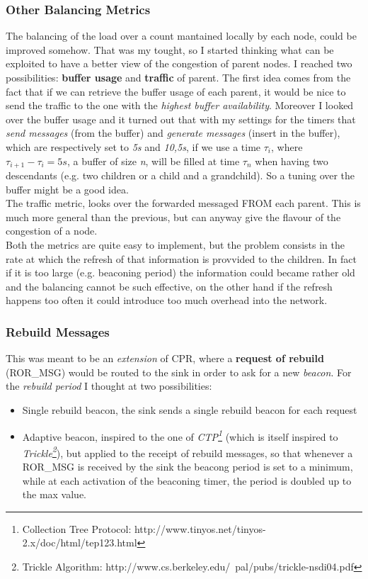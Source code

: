 \documentclass{article}
\begin{document}
		\subsubsection{Other Balancing Metrics}
		\label{sec:balancingMetrics}
The balancing of the load over a count mantained locally by each node, could be improved somehow. That was my tought, so I started thinking what can be exploited to have a better view of the congestion of parent nodes. I reached two possibilities: \textbf{buffer usage} and \textbf{traffic} of parent. The first idea comes from the fact that if we can retrieve the buffer usage of each parent, it would be nice to send the traffic to the one with the \emph{highest buffer availability}. Moreover I looked over the buffer usage and it turned out that with my settings for the timers that \emph{send messages} (from the buffer) and \emph{generate messages} (insert in the buffer), which are respectively set to \textit{5s} and \textit{10,5s}, if we use a time $\tau_i$, where $\tau_{i+1}-\tau_{i}=5s$, a buffer of size \emph{n}, will be filled at time $\tau_n$ when having two descendants (e.g. two children or a child and a grandchild). So a tuning over the buffer might be a good idea.
\\ The traffic metric, looks over the forwarded messaged FROM each parent. This is much more general than the previous, but can anyway give the flavour of the congestion of a node.
\\Both the metrics are quite easy to implement, but the problem consists in the rate at which the refresh of that information is provvided to the children. In fact if it is too large (e.g. beaconing period) the information could became rather old and the balancing cannot be such effective, on the other hand if the refresh happens too often it could introduce too much overhead into the network.

		\subsubsection{Rebuild Messages}
			\label{sec:rebuildMessages}
This was meant to be an \textit{extension} of CPR, where a \textbf{request of rebuild} (ROR\_MSG) would be routed to the sink in order to ask for a new \emph{beacon}. For the \textit{rebuild period} I thought at two possibilities:
			\begin{itemize}
				\item Single rebuild beacon, the sink sends a single rebuild beacon for each request
				\item Adaptive beacon, inspired to the one of \emph{CTP\footnote{Collection Tree Protocol: http://www.tinyos.net/tinyos-2.x/doc/html/tep123.html}} (which is itself inspired to \emph{Trickle\footnote{Trickle Algorithm: http://www.cs.berkeley.edu/~pal/pubs/trickle-nsdi04.pdf}}), but applied to the receipt of rebuild messages, so that whenever a ROR\_MSG is received by the sink the beacong period is set to a minimum, while at each activation of the beaconing timer, the period is doubled up to the max value.
			\end{itemize}
		
\end{document}
